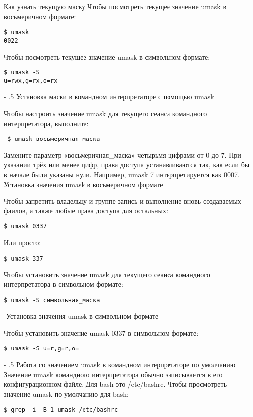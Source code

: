 \documentclass[a4paper,10pt,twoside]{article}
\makeatletter
\renewcommand\paragraph{%
   \@startsection{paragraph}{4}{0mm}%
      {-\baselineskip}%
      {.5\baselineskip}%
      {\normalfont\normalsize\bfseries}}
\makeatother
\begin{document}
Как узнать текущую маску
Чтобы посмотреть текущее значение umask в восьмеричном формате:
\begin{verbatim}
$ umask
0022
\end{verbatim} 

Чтобы посмотреть текущее значение umask в символьном формате:
\begin{verbatim}
$ umask -S
u=rwx,g=rx,o=rx
\end{verbatim} 

\paragraph{Установка маски в командном интерпретаторе с помощью umask}

Чтобы настроить значение umask для текущего сеанса командного интерпретатора, выполните:
\begin{verbatim}
 $ umask восьмеричная_маска
\end{verbatim} 

Замените параметр «восьмеричная\_маска» четырьмя цифрами от 0 до 7. При указании трёх или менее цифр, права доступа устанавливаются так, как если бы в начале были указаны нули. Например,  umask 7 интерпретируется как  0007.
⁠
Установка значения umask в восьмеричном формате

Чтобы запретить владельцу и группе запись и выполнение вновь создаваемых файлов, а также любые права доступа для остальных:
\begin{verbatim}
$ umask 0337
\end{verbatim} 
Или просто:
\begin{verbatim}
$ umask 337
\end{verbatim} 
Чтобы установить значение umask для текущего сеанса командного интерпретатора в символьном формате:
\begin{verbatim}
$ umask -S символьная_маска
\end{verbatim} 
⁠
Установка значения umask в символьном формате

Чтобы установить значение umask 0337 в символьном формате:
\begin{verbatim}
$ umask -S u=r,g=r,o=
\end{verbatim} 

\paragraph{Работа со значением umask в командном интерпретаторе по умолчанию}
Значение umask командного интерпретатора обычно записывается в его конфигурационном файле. Для bash это /etc/bashrc. Чтобы просмотреть значение umask по умолчанию для bash:
\begin{verbatim}
$ grep -i -B 1 umask /etc/bashrc
\end{verbatim} 
\end{document}
